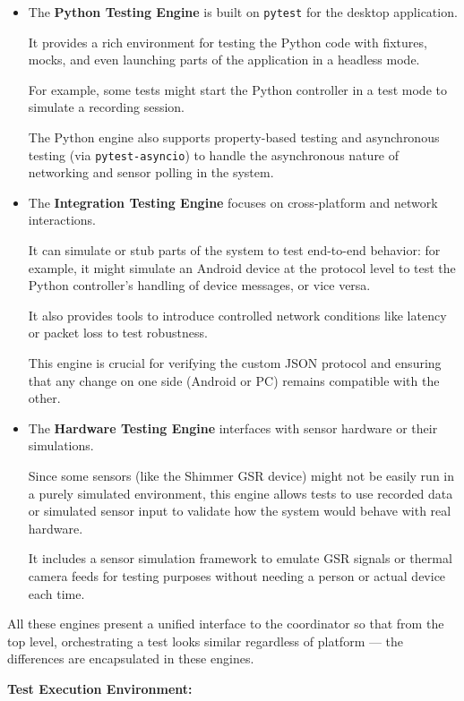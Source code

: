 {{\begin{itemize}
\item The \textbf{Python Testing Engine}
 is built on \texttt{pytest} for the desktop application.

It provides a rich environment for testing the Python code with fixtures, mocks,
and even launching parts of the application in a headless mode.

For example, some tests might start the Python controller in a test mode to
simulate a recording session.

The Python engine also supports property-based testing and asynchronous testing
(via \texttt{pytest-asyncio}) to handle the asynchronous nature of networking
and sensor polling in the system.

\item The \textbf{Integration Testing Engine}
 focuses on cross-platform and network interactions.

It can simulate or stub parts of the system to test end-to-end behavior: for
example, it might simulate an Android device at the protocol level to test the
Python controller's handling of device messages, or vice versa.

It also provides tools to introduce controlled network conditions like latency
or packet loss to test robustness.

This engine is crucial for verifying the custom JSON protocol and ensuring that
any change on one side (Android or PC) remains compatible with the other.

\item The \textbf{Hardware Testing Engine}
 interfaces with sensor hardware or their simulations.

Since some sensors (like the Shimmer GSR device) might not be easily run in a
purely simulated environment, this engine allows tests to use recorded data or
simulated sensor input to validate how the system would behave with real
hardware.

It includes a sensor simulation framework to emulate GSR signals or thermal
camera feeds for testing purposes without needing a person or actual device each
time.

\end{itemize}

All these engines present a unified interface to the coordinator so that from
the top level, orchestrating a test looks similar regardless of platform --- the
differences are encapsulated in these engines.

\textbf{Test Execution Environment:}

}}
